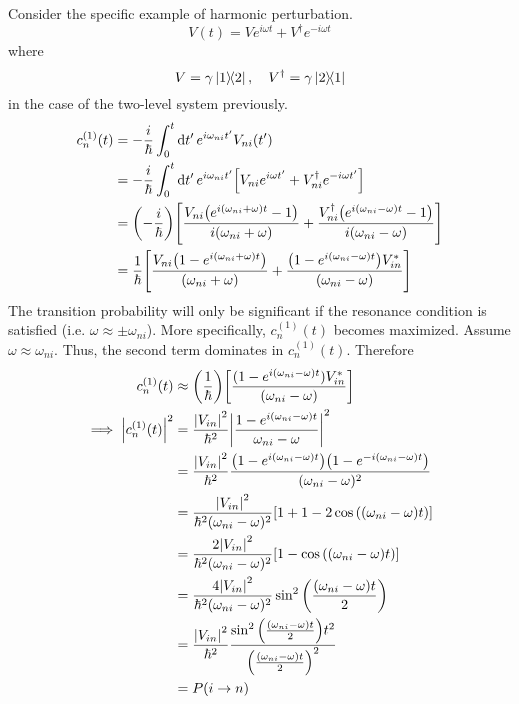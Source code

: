 \documentclass[12pt,a4paper,titlepage]{article}
\begin{document}
Consider the specific example of harmonic perturbation.
\begin{equation}
V(t)=Ve^{i\omega t}+V^{\dagger}e^{-i\omega t}
\end{equation}
where
\begin{equation}
V=\gamma\op{1}{2},\quad V^{\dagger}=\gamma\op{2}{1}
\end{equation}
in the case of the two-level system previously.
\begin{equation}
\begin{aligned}
c_{n}^{(1)}(t)&=-\frac{i}{\hbar}\int_{0}^{t}\dd{t'}e^{i\omega_{ni}t'}V_{ni}(t')\\
&=-\frac{i}{\hbar}\int_{0}^{t}\dd{t'}e^{i\omega_{ni}t'}\qty[V_{ni}e^{i\omega t'}+V_{ni}^{\dagger}e^{-i\omega t'}]\\
&=\qty(-\frac{i}{\hbar})\qty[\frac{V_{ni}\qty(e^{i(\omega_{ni}+\omega)t}-1)}{i(\omega_{ni}+\omega)}+\frac{V_{ni}^{\dagger}\qty(e^{i(\omega_{ni}-\omega)t}-1)}{i(\omega_{ni}-\omega)}]\\
&=\frac{1}{\hbar}\qty[\frac{V_{ni}\qty(1-e^{i(\omega_{ni}+\omega)t})}{(\omega_{ni}+\omega)}+\frac{\qty(1-e^{i(\omega_{ni}-\omega)t})V_{in}^{*}}{(\omega_{ni}-\omega)}]
\end{aligned}
\end{equation}
The transition probability will only be significant if the resonance condition is satisfied (i.e. $\omega\approx\pm\omega_{ni}$). More specifically, $c_{n}^{(1)}(t)$ becomes maximized. Assume $\omega\approx\omega_{ni}$. Thus, the second term dominates in $c_{n}^{(1)}(t)$. Therefore
\begin{equation}
\begin{aligned}
c_{n}^{(1)}(t)&\approx\qty(\frac{1}{\hbar})\qty[\frac{(1-e^{i(\omega_{ni}-\omega)t})V_{in}^{*}}{(\omega_{ni}-\omega)}]\\
\implies \abs{c_{n}^{(1)}(t)}^{2}&=\frac{\abs{V_{in}}^{2}}{\hbar^{2}}\abs{\frac{1-e^{i(\omega_{ni}-\omega)t}}{\omega_{ni}-\omega}}^{2}\\
&=\frac{\abs{V_{in}}^{2}}{\hbar^{2}}\frac{\qty(1-e^{i(\omega_{ni}-\omega)t})\qty(1-e^{-i(\omega_{ni}-\omega)t})}{(\omega_{ni}-\omega)^{2}}\\
&=\frac{\abs{V_{in}}^{2}}{\hbar^{2}(\omega_{ni}-\omega)^{2}}\qty[1+1-2\cos\qty(\qty(\omega_{ni}-\omega)t)]\\
&=\frac{2\abs{V_{in}}^{2}}{\hbar^{2}(\omega_{ni}-\omega)^{2}}\qty[1-\cos\qty(\qty(\omega_{ni}-\omega)t)]\\
&=\frac{4\abs{V_{in}}^{2}}{\hbar^{2}(\omega_{ni}-\omega)^{2}}\sin^{2}\qty(\frac{(\omega_{ni}-\omega)t}{2})\\
&=\frac{\abs{V_{in}}^{2}}{\hbar^{2}}\frac{\sin^{2}\qty(\frac{(\omega_{ni}-\omega)t}{2})t^{2}}{\qty(\frac{(\omega_{ni}-\omega)t}{2})^{2}}\\
&=P(i\rightarrow n)
\end{aligned}
\end{equation}
\end{document}

